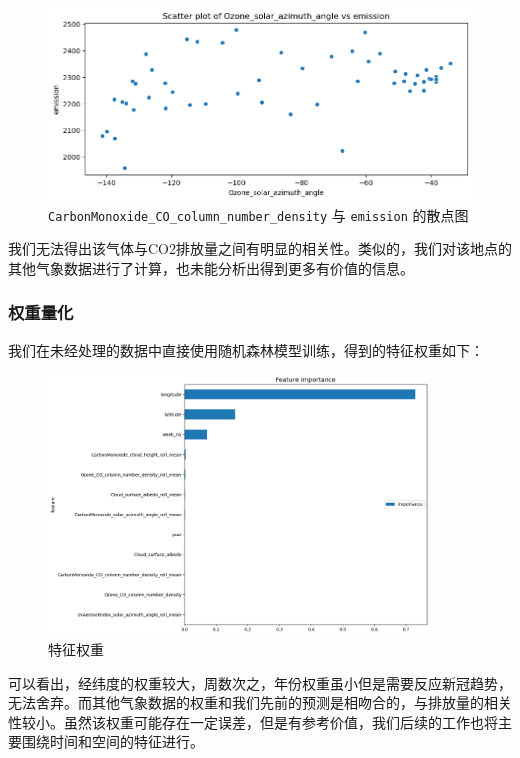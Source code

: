 \documentclass{ctexart}
\begin{document}
\begin{figure}[H]
      \centering
      \includegraphics[width=1\textwidth]{output7.png}
      \caption{\texttt{CarbonMonoxide\_CO\_column\_number\_density} 与 \texttt{emission} 的散点图}
      \label{fig:7}
\end{figure}

我们无法得出该气体与CO2排放量之间有明显的相关性。类似的，我们对该地点的其他气象数据进行了计算，也未能分析出得到更多有价值的信息。

\subsubsection{权重量化}

我们在未经处理的数据中直接使用随机森林模型训练，得到的特征权重如下：

\begin{figure}[H]
      \centering
      \includegraphics[width=0.9\textwidth]{output11.png}
      \caption{特征权重}
      \label{fig:11}
\end{figure}

可以看出，经纬度的权重较大，周数次之，年份权重虽小但是需要反应新冠趋势，无法舍弃。而其他气象数据的权重和我们先前的预测是相吻合的，与排放量的相关性较小。虽然该权重可能存在一定误差，但是有参考价值，我们后续的工作也将主要围绕时间和空间的特征进行。
\end{document}
